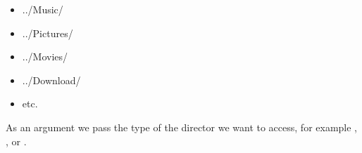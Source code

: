 \begin{itemize}
\item{../Music/}
\item{../Pictures/}
\item{../Movies/}
\item{../Download/}
\item{etc.}
\end{itemize}

As an argument we pass the type of the director we want to access, for example , , or . %




